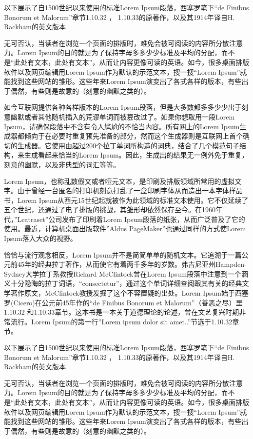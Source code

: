 \documentclass[10pt,openany]{book}
\begin{document}
以下展示了自1500世纪以来使用的标准Lorem Ipsum段落，西塞罗笔下“de Finibus Bonorum et Malorum”章节1.10.32 ， 1.10.33的原著作，以及其1914年译自H. Rackham的英文版本

无可否认，当读者在浏览一个页面的排版时，难免会被可阅读的内容所分散注意力。Lorem Ipsum的目的就是为了保持字母多多少少标准及平均的分配，而不是“此处有文本，此处有文本”，从而让内容更像可读的英语。如今，很多桌面排版软件以及网页编辑用Lorem Ipsum作为默认的示范文本，搜一搜“Lorem Ipsum”就能找到这些网站的雏形。这些年来Lorem Ipsum演变出了各式各样的版本，有些出于偶然，有些则是故意的（刻意的幽默之类的）。

如今互联网提供各种各样版本的Lorem Ipsum段落，但是大多数都多多少少出于刻意幽默或者其他随机插入的荒谬单词而被篡改过了。如果你想取用一段Lorem Ipsum，请确保段落中不含有令人尴尬的不恰当内容。所有网上的Lorem Ipsum生成器都倾向于在必要时重复预先准备的部分，然而这个生成器则是互联网上首个确切的生成器。它使用由超过200个拉丁单词所构造的词典，结合了几个模范句子结构，来生成看起来恰当的Lorem Ipsum。因此，生成出的结果无一例外免于重复，刻意的幽默，以及非典型的词汇等等。

Lorem Ipsum，也称乱数假文或者哑元文本，是印刷及排版领域所常用的虚拟文字。由于曾经一台匿名的打印机刻意打乱了一盒印刷字体从而造出一本字体样品书，Lorem Ipsum从西元15世纪起就被作为此领域的标准文本使用。它不仅延续了五个世纪，还通过了电子排版的挑战，其雏形却依然保存至今。在1960年代，”Leatraset”公司发布了印刷着Lorem Ipsum段落的纸张，从而广泛普及了它的使用。最近，计算机桌面出版软件”Aldus PageMaker”也通过同样的方式使Lorem Ipsum落入大众的视野。

恰恰与流行观念相反，Lorem Ipsum并不是简简单单的随机文本。它追溯于一篇公元前45年的经典拉丁著作，从而使它有着两千多年的岁数。弗吉尼亚州Hampden-Sydney大学拉丁系教授Richard McClintock曾在Lorem Ipsum段落中注意到一个涵义十分隐晦的拉丁词语，“consectetur”，通过这个单词详细查阅跟其有关的经典文学著作原文，McClintock教授发掘了这个不容置疑的出处。Lorem Ipsum始于西塞罗(Cicero)在公元前45年作的“de Finibus Bonorum et Malorum”（善恶之尽）里1.10.32 和1.10.33章节。这本书是一本关于道德理论的论述，曾在文艺复兴时期非常流行。Lorem Ipsum的第一行”Lorem ipsum dolor sit amet..”节选于1.10.32章节。

以下展示了自1500世纪以来使用的标准Lorem Ipsum段落，西塞罗笔下“de Finibus Bonorum et Malorum”章节1.10.32 ， 1.10.33的原著作，以及其1914年译自H. Rackham的英文版本

无可否认，当读者在浏览一个页面的排版时，难免会被可阅读的内容所分散注意力。Lorem Ipsum的目的就是为了保持字母多多少少标准及平均的分配，而不是“此处有文本，此处有文本”，从而让内容更像可读的英语。如今，很多桌面排版软件以及网页编辑用Lorem Ipsum作为默认的示范文本，搜一搜“Lorem Ipsum”就能找到这些网站的雏形。这些年来Lorem Ipsum演变出了各式各样的版本，有些出于偶然，有些则是故意的（刻意的幽默之类的）。
\end{document}
